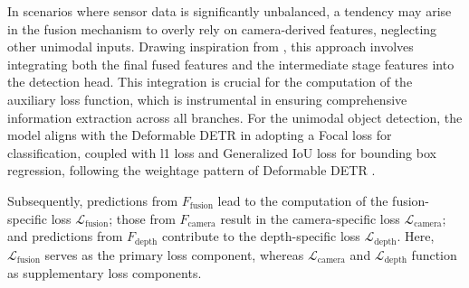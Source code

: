 \documentclass[report.tex]{subfiles}
\begin{document}




    In scenarios where sensor data is significantly unbalanced, a tendency may arise in the fusion mechanism to overly rely on camera-derived features, neglecting other unimodal inputs. Drawing inspiration from \cite{cai2018cascade} \cite{carion2020end}, this approach involves integrating both the final fused features and the intermediate stage features into the detection head. This integration is crucial for the computation of the auxiliary loss function, which is instrumental in ensuring comprehensive information extraction across all branches. For the unimodal object detection, the model aligns with the Deformable DETR \cite{zhu2021deformable} in adopting a Focal loss \cite{lin2017focal} for classification, coupled with l1 loss and Generalized IoU loss \cite{rezatofighi2019generalized} for bounding box regression, following the weightage pattern of Deformable DETR \cite{zhu2021deformable}.

    Subsequently, predictions from \( F_{\text{fusion}} \) lead to the computation of the fusion-specific loss \( \mathcal{L}_{\text{fusion}} \); those from \( F_{\text{camera}} \) result in the camera-specific loss \( \mathcal{L}_{\text{camera}} \); and predictions from \( F_{\text{depth}} \) contribute to the depth-specific loss \( \mathcal{L}_{\text{depth}} \). Here, \( \mathcal{L}_{\text{fusion}} \) serves as the primary loss component, whereas \( \mathcal{L}_{\text{camera}} \) and \( \mathcal{L}_{\text{depth}} \) function as supplementary loss components.
\end{document}
